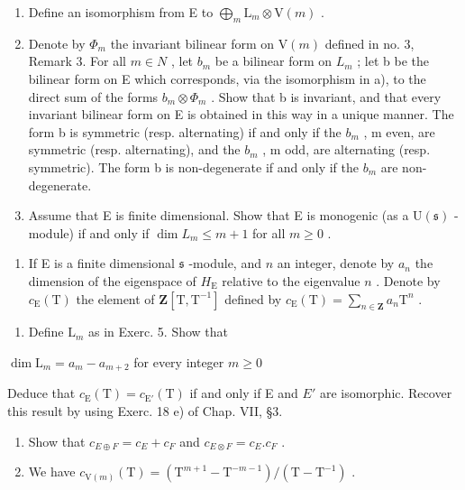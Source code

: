 \begin{enumerate}
\def\labelenumi{\alph{enumi})}
\item
  Define an isomorphism from E to \(\bigoplus_{m} \mathrm{L}_{m} \otimes \mathrm{V}(m)\) .
\item
  Denote by \(\Phi_{m}\) the invariant bilinear form on \(\mathrm{V}(m)\) defined in no. 3, Remark 3. For all \(m \in N\) , let \(b_{m}\) be a bilinear form on \(L_{m}\) ; let b be the bilinear form on E which corresponds, via the isomorphism in a), to the direct sum of the forms \(b_{m} \otimes \Phi_{m}\) . Show that b is invariant, and that every invariant bilinear form on E is obtained in this way in a unique manner. The form b is symmetric (resp. alternating) if and only if the \(b_{m}\) , m even, are symmetric (resp. alternating), and the \(b_{m}\) , m odd, are alternating (resp. symmetric). The form b is non-degenerate if and only if the \(b_{m}\) are non-degenerate.
\item
  Assume that E is finite dimensional. Show that E is monogenic (as a \(\mathrm{U}(\mathfrak{s})\) -module) if and only if \(\dim L_{m} \leq m + 1\) for all \(m \geq 0\) .
\end{enumerate}

\begin{enumerate}
\def\labelenumi{\arabic{enumi})}
\setcounter{enumi}{5}
\tightlist
\item
  If E is a finite dimensional \(\mathfrak{s}\) -module, and \(n\) an integer, denote by \(a_{n}\) the dimension of the eigenspace of \(H_{\mathrm{E}}\) relative to the eigenvalue \(n\) . Denote by \(c_{\mathrm{E}}(\mathrm{T})\) the element of \(\mathbf{Z}[\mathrm{T},\mathrm{T}^{-1}]\) defined by \(c_{\mathrm{E}}(\mathrm{T}) = \sum_{n\in \mathbf{Z}}a_n\mathrm{T}^n\) .
\end{enumerate}

\begin{enumerate}
\def\labelenumi{\alph{enumi})}
\tightlist
\item
  Define \(\mathrm{L}_m\) as in Exerc. 5. Show that
\end{enumerate}

\(\dim \mathrm{L}_m = a_m - a_{m + 2}\) for every integer \(m\geq 0\)

Deduce that \(c_{\mathrm{E}}(\mathrm{T}) = c_{\mathrm{E}'}(\mathrm{T})\) if and only if E and \(E'\) are isomorphic. Recover this result by using Exerc. 18 e) of Chap. VII, §3.

\begin{enumerate}
\def\labelenumi{\alph{enumi})}
\setcounter{enumi}{1}
\item
  Show that \(c_{E\oplus F} = c_{E} + c_{F}\) and \(c_{E\otimes F} = c_{E}.c_{F}\) .
\item
  We have \(c_{\mathrm{V}(m)}(\mathrm{T}) = (\mathrm{T}^{m + 1} - \mathrm{T}^{-m - 1}) / (\mathrm{T} - \mathrm{T}^{-1})\) .
\end{enumerate}

